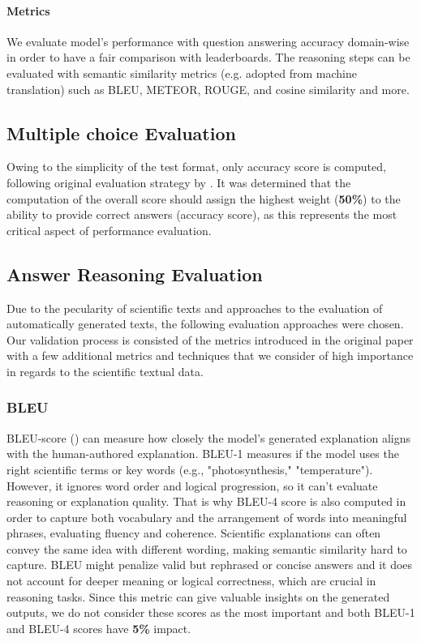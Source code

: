 \documentclass{article}
\begin{document}
\paragraph{Metrics}
We evaluate model's performance with question answering accuracy domain-wise in order to have a fair comparison with leaderboards. The reasoning steps can be evaluated with semantic similarity metrics (e.g. adopted from machine translation) such as BLEU, METEOR, ROUGE, and cosine similarity and more.
\subsection{Multiple choice Evaluation}
Owing to the simplicity of the test format, only accuracy score is computed, following original evaluation strategy by \cite{lu2022learn}. It was determined that the computation of the overall score should assign the highest weight (\textbf{50\%}) to the ability to provide correct answers (accuracy score), as this represents the most critical aspect of performance evaluation.
\subsection{Answer Reasoning Evaluation}
Due to the pecularity of scientific texts and approaches to the evaluation of automatically generated texts, the following evaluation approaches were chosen. Our validation process is consisted of the metrics introduced in the original paper \cite{lu2022learn}  with a few additional metrics and techniques that we consider of high importance in regards to the scientific textual data.

\subsubsection{BLEU}
BLEU-score (\cite{papineni2002bleu}) can measure how closely the model's generated explanation aligns with the human-authored explanation. BLEU-1 measures if the model uses the right scientific terms or key words (e.g., "photosynthesis," "temperature"). However, it ignores word order and logical progression, so it can’t evaluate reasoning or explanation quality. That is why BLEU-4 score is also computed in order to capture both vocabulary and the arrangement of words into meaningful phrases, evaluating fluency and coherence.
Scientific explanations can often convey the same idea with different wording, making semantic similarity hard to capture.
BLEU might penalize valid but rephrased or concise answers and it does not account for deeper meaning or logical correctness, which are crucial in reasoning tasks. Since this metric can give valuable insights on the generated outputs, we do not consider these scores as the most important and both BLEU-1 and BLEU-4 scores have \textbf{5\%} impact.
\end{document}

